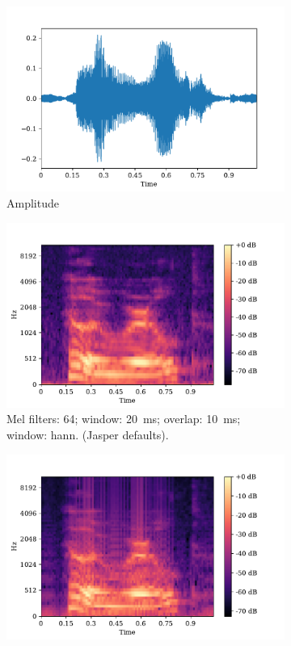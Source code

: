 \begin{figure}[]
	\centering
	\begin{subfigure}[t]{.49\textwidth}
		\centering
		\includegraphics[width=.8\linewidth]{img/mel_amplitude}
		\caption{Amplitude}
		\label{fig:sfig1}
	\end{subfigure}%
	\hfill
	\begin{subfigure}[t]{.49\textwidth}
		\centering
		\includegraphics[width=.8\linewidth]{img/mel_jasper}
		\caption{Mel filters: 64; window: 20~ms; overlap: 10~ms; window: hann. (Jasper defaults).}
		\label{fig:sfig2}
	\end{subfigure}
	\begin{subfigure}[b]{.49\textwidth}
		\centering
		\includegraphics[width=.8\linewidth]{img/mel2}

\end{subfigure}
\end{figure}
